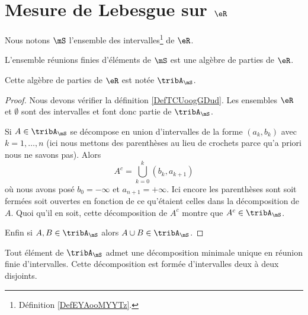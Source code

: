 \section{Mesure de Lebesgue sur \texorpdfstring{$ \eR$}{R}}
\label{SecZTFooXlkwk}

Nous notons \( \mS\) l'ensemble des intervalles\footnote{Définition \ref{DefEYAooMYYTz}.} de \( \eR\).

\begin{proposition}
    L'ensemble réunions finies d'éléments de \( \mS\) est une algèbre de parties de \( \eR\).
\end{proposition}
Cette algèbre de parties de $\eR$ est notée \( \tribA_{\mS}\).

\begin{proof}

    Nous devons vérifier la définition \ref{DefTCUoogGDud}. Les ensembles \( \eR\) et \( \emptyset\) sont des intervalles et font donc partie de \( \tribA_{\mS}\).
    
    Si \( A\in\tribA_{\mS}\) se décompose en union d'intervalles de la forme \( (a_k,b_k)\) avec \( k=1,\ldots, n\) (ici nous mettons des parenthèses au lieu de crochets parce qu'a priori nous ne savons pas). Alors
    \begin{equation}
        A^c=\bigcup_{k=0}^{k}(b_k,a_{k+1})
    \end{equation}
    où nous avons posé \( b_0=-\infty\) et \( a_{n+1}=+\infty\). Ici encore les parenthèses sont soit fermées soit ouvertes en fonction de ce qu'étaient celles dans la décomposition de \( A\). Quoi qu'il en soit, cette décomposition de \( A^c\) montre que \( A^c\in\tribA_{\mS}\).

    Enfin si \( A,B\in\tribA_{\mS}\) alors \( A\cup B\in\tribA_{\mS}\).
\end{proof}

\begin{lemma}
    Tout élément de \( \tribA_{\mS}\) admet une décomposition minimale unique en réunion finie d'intervalles. Cette décomposition est formée d'intervalles deux à deux disjoints.
\end{lemma}

